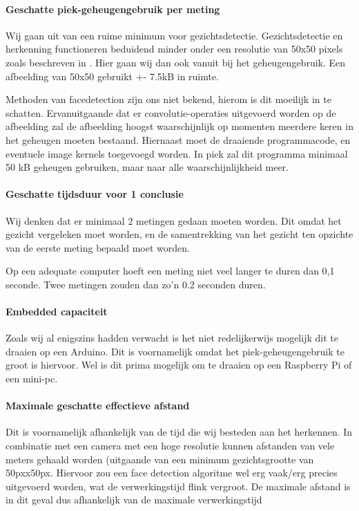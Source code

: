 \documentclass[11pt]{article}
\begin{document}
    \paragraph{Geschatte piek-geheugengebruik per meting}
    Wij gaan uit van een ruime minimum voor gezichtsdetectie.
    Gezichtsdetectie en herkenning functioneren beduidend minder onder een resolutie van 50x50 pixels zoals beschreven in \citet{boom2006effect}.
    Hier gaan wij dan ook vanuit bij het geheugengebruik.
    Een afbeelding van 50x50 gebruikt +- 7.5kB in ruimte.

    Methoden van facedetection zijn ons niet bekend, hierom is dit moeilijk in te schatten.
    Ervanuitgaande dat er convolutie-operaties uitgevoerd worden op de afbeelding zal de afbeelding hoogst waarschijnlijk op momenten meerdere keren in het geheugen moeten bestaand.
    Hiernaast moet de draaiende programmacode, en eventuele image kernels toegevoegd worden.
    In piek zal dit programma minimaal 50 kB geheugen gebruiken, maar naar alle waarschijnlijkheid meer.

    \paragraph{Geschatte tijdsduur voor 1 conclusie}
    Wij denken dat er minimaal 2 metingen gedaan moeten worden.
    Dit omdat het gezicht vergeleken moet worden, en de samentrekking van het gezicht ten opzichte van de eerste meting bepaald moet worden.

    Op een adequate computer hoeft een meting niet veel langer te duren dan 0,1 seconde.
    Twee metingen zouden dan zo'n 0.2 seconden duren.

    \paragraph{Embedded capaciteit}
    Zoals wij al enigszins hadden verwacht is het niet redelijkerwijs mogelijk dit te draaien op een Arduino.
    Dit is voornamelijk omdat het piek-geheugengebruik te groot is hiervoor.
    Wel is dit prima mogelijk om te draaien op een Raspberry Pi of een mini-pc.

    \paragraph{Maximale geschatte effectieve afstand}
    Dit is voornamelijk afhankelijk van de tijd die wij besteden aan het herkennen.
    In combinatie met een camera met een hoge resolutie kunnen afstanden van vele meters gehaald worden (uitgaande van een minimum gezichtsgrootte van 50pxx50px.
    Hiervoor zou een face detection algoritme wel erg vaak/erg precies uitgevoerd worden, wat de verwerkingstijd flink vergroot.
    De maximale afstand is in dit geval dus afhankelijk van de maximale verwerkingstijd
\end{document}
